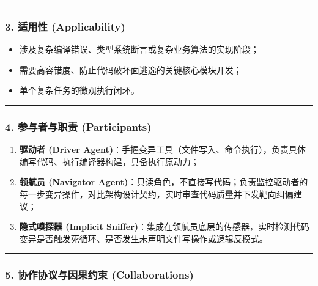 \begin{center}\rule{0.5\linewidth}{0.5pt}\end{center}

\subsubsection{3. 适用性
(Applicability)}\label{ux9002ux7528ux6027-applicability-6}

\begin{itemize}
\tightlist
\item
  涉及复杂编译错误、类型系统断言或复杂业务算法的实现阶段；
\item
  需要高容错度、防止代码破坏面逃逸的关键核心模块开发；
\item
  单个复杂任务的微观执行闭环。
\end{itemize}

\begin{center}\rule{0.5\linewidth}{0.5pt}\end{center}

\subsubsection{4. 参与者与职责
(Participants)}\label{ux53c2ux4e0eux8005ux4e0eux804cux8d23-participants-6}

\begin{enumerate}
\def\labelenumi{\arabic{enumi}.}
\tightlist
\item
  \textbf{驱动者 (Driver
  Agent)}：手握变异工具（文件写入、命令执行），负责具体编写代码、执行编译器构建，具备执行原动力；
\item
  \textbf{领航员 (Navigator
  Agent)}：只读角色，不直接写代码；负责监控驱动者的每一步变异操作，对比架构设计契约，实时审查代码质量并下发靶向纠偏建议；
\item
  \textbf{隐式嗅探器 (Implicit
  Sniffer)}：集成在领航员底层的传感器，实时检测代码变异是否触发死循环、是否发生未声明文件写操作或逻辑反模式。
\end{enumerate}

\begin{center}\rule{0.5\linewidth}{0.5pt}\end{center}

\subsubsection{5. 协作协议与因果约束
(Collaborations)}\label{ux534fux4f5cux534fux8baeux4e0eux56e0ux679cux7ea6ux675f-collaborations-3}


